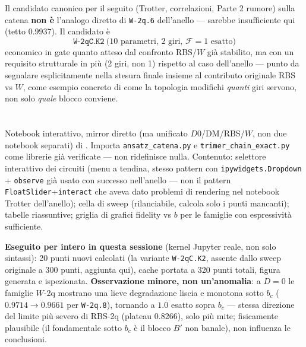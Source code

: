 \documentclass[11pt,a4paper]{article}
\begin{document}
Il candidato canonico per il seguito (Trotter, correlazioni, Parte 2 rumore) sulla
catena \textbf{non è} l'analogo diretto di \texttt{W-2q.6} dell'anello — sarebbe
insufficiente qui (tetto $0.9937$). Il candidato è
\[
\boxed{\texttt{W-2qC.K2}\ \text{(10 parametri, 2 giri, }\mathcal F=1\text{ esatto)}}
\]
economico in gate quanto atteso dal confronto RBS/$W$ già stabilito, ma con un
requisito strutturale in più (2 giri, non 1) rispetto al caso dell'anello — punto
da segnalare esplicitamente nella stesura finale insieme al contributo originale
RBS vs $W$, come esempio concreto di come la topologia modifichi \emph{quanti} giri
servono, non solo \emph{quale} blocco conviene.

\section*{\texttt{}}

Notebook interattivo, mirror diretto (ma unificato $D0$/DM/RBS/$W$, non due
notebook separati) di \texttt{}.
Importa \texttt{ansatz\_catena.py} e \texttt{trimer\_chain\_exact.py} come librerie
già verificate — non ridefinisce nulla. Contenuto: selettore interattivo dei
circuiti (menu a tendina, stesso pattern con \texttt{ipywidgets.Dropdown} +
\texttt{observe} già usato con successo nell'anello — non il pattern
\texttt{FloatSlider}+\texttt{interact} che aveva dato problemi di rendering nel
notebook Trotter dell'anello); cella di sweep (rilanciabile, calcola solo i punti
mancanti); tabelle riassuntive; griglia di grafici fidelity vs $b$ per le famiglie
con espressività sufficiente.

\textbf{Eseguito per intero in questa sessione} (kernel Jupyter reale, non solo
sintassi): 20 punti nuovi calcolati (la variante \texttt{W-2qC.K2}, assente dallo
sweep originale a 300 punti, aggiunta qui), cache portata a 320 punti totali,
figura \texttt{} generata e
ispezionata. \textbf{Osservazione minore, non un'anomalia}: a $D=0$ le famiglie
$W$-2q mostrano una lieve degradazione liscia e monotona sotto $b_c$ ($0.9714\to
0.9661$ per \texttt{W-2q.8}), tornando a $1.0$ esatto sopra $b_c$ — stessa direzione
del limite più severo di RBS-2q (plateau $0.8266$), solo più mite; fisicamente
plausibile (il fondamentale sotto $b_c$ è il blocco $B'$ non banale), non
influenza le conclusioni.

\section*{\texttt{}}
\end{document}
